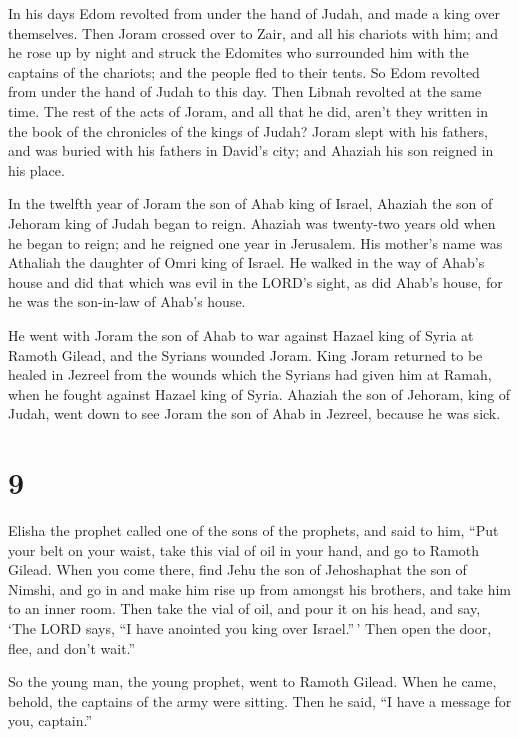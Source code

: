  In his days Edom revolted from under the hand of Judah,
and made a king over themselves.  Then Joram crossed over
to Zair, and all his chariots with him; and he rose up by night and
struck the Edomites who surrounded him with the captains of the
chariots; and the people fled to their tents.  So Edom
revolted from under the hand of Judah to this day. Then Libnah revolted
at the same time.  The rest of the acts of Joram, and all
that he did, aren't they written in the book of the chronicles of the
kings of Judah?  Joram slept with his fathers, and was
buried with his fathers in David's city; and Ahaziah his son reigned in
his place.

 In the twelfth year of Joram the son of Ahab king of
Israel, Ahaziah the son of Jehoram king of Judah began to reign.
 Ahaziah was twenty-two years old when he began to reign;
and he reigned one year in Jerusalem. His mother's name was Athaliah the
daughter of Omri king of Israel.  He walked in the way of
Ahab's house and did that which was evil in the LORD's sight, as did
Ahab's house, for he was the son-in-law of Ahab's house.

 He went with Joram the son of Ahab to war against Hazael
king of Syria at Ramoth Gilead, and the Syrians wounded Joram.
 King Joram returned to be healed in Jezreel from the
wounds which the Syrians had given him at Ramah, when he fought against
Hazael king of Syria. Ahaziah the son of Jehoram, king of Judah, went
down to see Joram the son of Ahab in Jezreel, because he was sick.

\hypertarget{section-8}{%
\section{9}\label{section-8}}

 Elisha the prophet called one of the sons of the
prophets, and said to him, ``Put your belt on your waist, take this vial
of oil in your hand, and go to Ramoth Gilead.  When you
come there, find Jehu the son of Jehoshaphat the son of Nimshi, and go
in and make him rise up from amongst his brothers, and take him to an
inner room.  Then take the vial of oil, and pour it on his
head, and say, `The LORD says, ``I have anointed you king over
Israel.''\,' Then open the door, flee, and don't wait.''

 So the young man, the young prophet, went to Ramoth
Gilead.  When he came, behold, the captains of the army
were sitting. Then he said, ``I have a message for you, captain.''

